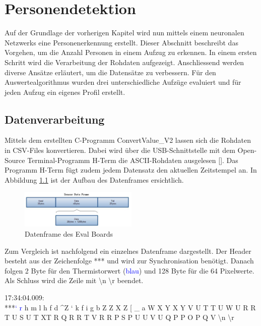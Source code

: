 \chapter{Personendetektion}
\label{chap:Personendetektion}

Auf der Grundlage der vorherigen Kapitel wird nun mittels einem neuronalen Netzwerks eine Personenerkennung erstellt. Dieser Abschnitt beschreibt das Vorgehen, um die Anzahl Personen in einem Aufzug zu erkennen. In einem ersten Schritt wird die Verarbeitung der Rohdaten aufgezeigt. Anschliessend werden diverse Ansätze erläutert, um die Datensätze zu verbessern. Für den Auswertealgorithmus wurden drei unterschiedliche Aufzüge evaluiert und für jeden Aufzug ein eigenes Profil erstellt. 

\section{Datenverarbeitung}
\label{Datenverarbeitung}

Mittels dem erstellten C-Programm ConvertValue\_V2 lassen sich die Rohdaten in \ac{CSV}-Files konvertieren. Dabei wird über die USB-Schnittstelle mit dem Open-Source Terminal-Programm H-Term die \ac{ASCII}-Rohdaten ausgelesen [\protect\cite{HTERM}].
Das Programm H-Term fügt zudem jedem Datensatz den aktuellen Zeitstempel an. In Abbildung \ref{fig:Dataframe} ist der Aufbau des Datenframes ersichtlich.

\begin{figure}[H]
	\centering
	\includegraphics[width=0.5\textwidth]
	{fig/Dataframe}
	\caption[Datenframe des Eval Boards]{Datenframe des Eval Boards}
	\label{fig:Dataframe}
\end{figure}

Zum Vergleich ist nachfolgend ein einzelnes Datenframe dargestellt. Der Header besteht aus der Zeichenfolge *** und wird zur Synchronisation benötigt. Danach folgen 2 Byte für den Thermistorwert (\textcolor{blue}{blau}) und 128 Byte für die 64 Pixelwerte. Als Schluss wird die Zeile mit \textbackslash n \textbackslash r beendet.

17:34:04.009: \\
***\textcolor{blue}{‘ r} h m l h f d \^ \space \space Z ` k f i g b Z Z X Z [ \_ a W X Y X Y V U T T U W U R R T U S U T XT R Q R R T V R R P S P U U V U Q P P O P Q V  \textbackslash n \textbackslash r \\

